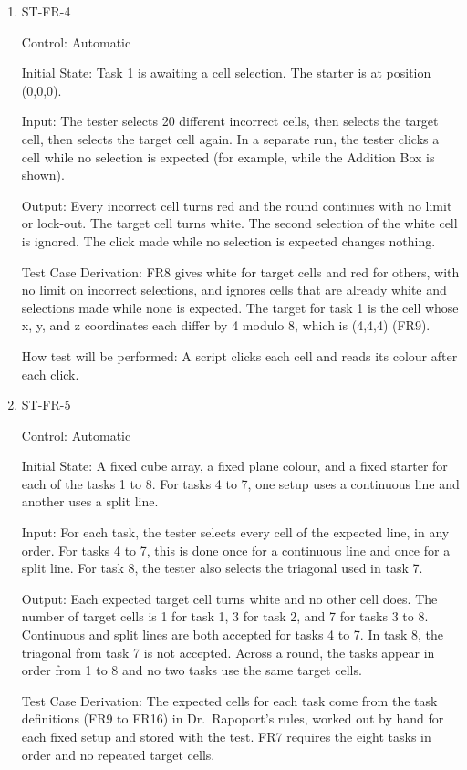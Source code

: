 \documentclass[12pt, titlepage]{article}
\begin{document}
\begin{enumerate}

\item{ST-FR-4\\}

Control: Automatic

Initial State: Task 1 is awaiting a cell selection. The starter is at position (0,0,0).

Input: The tester selects 20 different incorrect cells, then selects the target cell, then selects the target cell again. In a separate run, the tester clicks a cell while no selection is expected (for example, while the Addition Box is shown).

Output: Every incorrect cell turns red and the round continues with no limit or lock-out. The target cell turns white. The second selection of the white cell is ignored. The click made while no selection is expected changes nothing.

Test Case Derivation: FR8 gives white for target cells and red for others, with no limit on incorrect selections, and ignores cells that are already white and selections made while none is expected. The target for task 1 is the cell whose x, y, and z coordinates each differ by 4 modulo 8, which is (4,4,4) (FR9).

How test will be performed: A script clicks each cell and reads its colour after each click.

\item{ST-FR-5\\}

Control: Automatic

Initial State: A fixed cube array, a fixed plane colour, and a fixed starter for each of the tasks 1 to 8. For tasks 4 to 7, one setup uses a continuous line and another uses a split line.

Input: For each task, the tester selects every cell of the expected line, in any order. For tasks 4 to 7, this is done once for a continuous line and once for a split line. For task 8, the tester also selects the triagonal used in task 7.

Output: Each expected target cell turns white and no other cell does. The number of target cells is 1 for task 1, 3 for task 2, and 7 for tasks 3 to 8. Continuous and split lines are both accepted for tasks 4 to 7. In task 8, the triagonal from task 7 is not accepted. Across a round, the tasks appear in order from 1 to 8 and no two tasks use the same target cells.

Test Case Derivation: The expected cells for each task come from the task definitions (FR9 to FR16) in Dr.\ Rapoport's rules, worked out by hand for each fixed setup and stored with the test. FR7 requires the eight tasks in order and no repeated target cells.


\end{enumerate}
\end{document}
